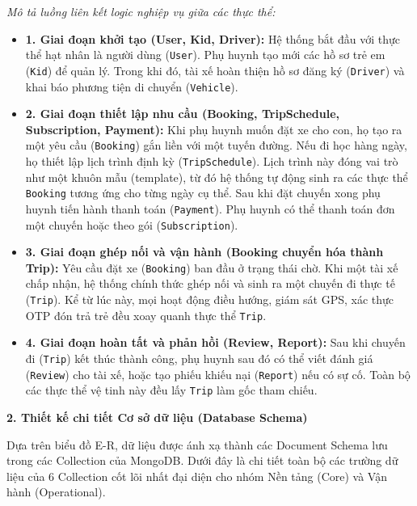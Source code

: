 \documentclass[../DoAn.tex]{subfiles}
\begin{document}
\textit{Mô tả luồng liên kết logic nghiệp vụ giữa các thực thể:}
\begin{itemize}
    \item \textbf{1. Giai đoạn khởi tạo (User, Kid, Driver):} Hệ thống bắt đầu với thực thể hạt nhân là người dùng (\texttt{User}). Phụ huynh tạo mới các hồ sơ trẻ em (\texttt{Kid}) để quản lý. Trong khi đó, tài xế hoàn thiện hồ sơ đăng ký (\texttt{Driver}) và khai báo phương tiện di chuyển (\texttt{Vehicle}).
    \item \textbf{2. Giai đoạn thiết lập nhu cầu (Booking, TripSchedule, Subscription, Payment):} Khi phụ huynh muốn đặt xe cho con, họ tạo ra một yêu cầu (\texttt{Booking}) gắn liền với một tuyến đường. Nếu đi học hàng ngày, họ thiết lập lịch trình định kỳ (\texttt{TripSchedule}). Lịch trình này đóng vai trò như một khuôn mẫu (template), từ đó hệ thống tự động sinh ra các thực thể \texttt{Booking} tương ứng cho từng ngày cụ thể. Sau khi đặt chuyến xong phụ huynh tiến hành thanh toán (\texttt{Payment}). Phụ huynh có thể thanh toán đơn một chuyến hoặc theo gói (\texttt{Subscription}).
    \item \textbf{3. Giai đoạn ghép nối và vận hành (Booking chuyển hóa thành Trip):} Yêu cầu đặt xe (\texttt{Booking}) ban đầu ở trạng thái chờ. Khi một tài xế chấp nhận, hệ thống chính thức ghép nối và sinh ra một chuyến đi thực tế (\texttt{Trip}). Kể từ lúc này, mọi hoạt động điều hướng, giám sát GPS, xác thực OTP đón trả trẻ đều xoay quanh thực thể \texttt{Trip}.
    \item \textbf{4. Giai đoạn hoàn tất và phản hồi (Review, Report):} Sau khi chuyến đi (\texttt{Trip}) kết thúc thành công, phụ huynh sau đó có thể viết đánh giá (\texttt{Review}) cho tài xế, hoặc tạo phiếu khiếu nại (\texttt{Report}) nếu có sự cố. Toàn bộ các thực thể vệ tinh này đều lấy \texttt{Trip} làm gốc tham chiếu.
\end{itemize}

\newpage
\textbf{2. Thiết kế chi tiết Cơ sở dữ liệu (Database Schema)}

Dựa trên biểu đồ E-R, dữ liệu được ánh xạ thành các Document Schema lưu trong các Collection của MongoDB. Dưới đây là chi tiết toàn bộ các trường dữ liệu của 6 Collection cốt lõi nhất đại diện cho nhóm Nền tảng (Core) và Vận hành (Operational).
\end{document}
